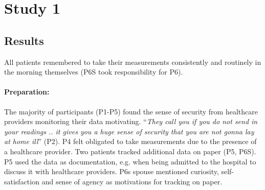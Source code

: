 \section{Study 1}

\subsection{Results}
All patients remembered to take their measurements consistently and routinely in the morning themselves (P6S took responsibility for P6). 

\paragraph{Preparation:} 
The majority of participants (P1-P5) found the sense of security from healthcare providers monitoring their data motivating. “\textit{They call you if you do not send in your readings .. it gives you a huge sense of security that you are not gonna lay at home ill}” (P2). P4 felt obligated to take measurements due to the presence of a healthcare provider. Two patients tracked additional data on paper (P5, P6S). P5 used the data as documentation, e.g. when being admitted to the hospital to discuss it with healthcare providers. P6s spouse mentioned curiosity, self-satisfaction and sense of agency as motivations for tracking on paper. 

